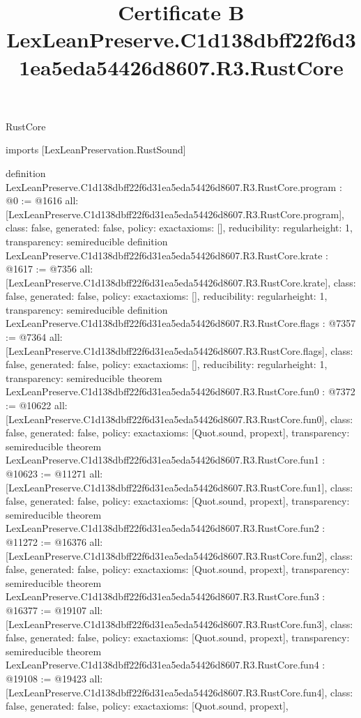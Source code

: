 \begin{lexlean}{RustCore}
\title{Certificate B LexLeanPreserve.C1d138dbff22f6d31ea5eda54426d8607.R3.RustCore}
\begin{coremodule}
imports [LexLeanPreservation.RustSound]

definition LexLeanPreserve.C1d138dbff22f6d31ea5eda54426d8607.R3.RustCore.program : @0 := @1616 {
  all: [LexLeanPreserve.C1d138dbff22f6d31ea5eda54426d8607.R3.RustCore.program],
  class: false,
  generated: false,
  policy: exact{axioms: []},
  reducibility: regular{height: 1},
  transparency: semireducible
}
definition LexLeanPreserve.C1d138dbff22f6d31ea5eda54426d8607.R3.RustCore.krate : @1617 := @7356 {
  all: [LexLeanPreserve.C1d138dbff22f6d31ea5eda54426d8607.R3.RustCore.krate],
  class: false,
  generated: false,
  policy: exact{axioms: []},
  reducibility: regular{height: 1},
  transparency: semireducible
}
definition LexLeanPreserve.C1d138dbff22f6d31ea5eda54426d8607.R3.RustCore.flags : @7357 := @7364 {
  all: [LexLeanPreserve.C1d138dbff22f6d31ea5eda54426d8607.R3.RustCore.flags],
  class: false,
  generated: false,
  policy: exact{axioms: []},
  reducibility: regular{height: 1},
  transparency: semireducible
}
theorem LexLeanPreserve.C1d138dbff22f6d31ea5eda54426d8607.R3.RustCore.fun0 : @7372 := @10622 {
  all: [LexLeanPreserve.C1d138dbff22f6d31ea5eda54426d8607.R3.RustCore.fun0],
  class: false,
  generated: false,
  policy: exact{axioms: [Quot.sound, propext]},
  transparency: semireducible
}
theorem LexLeanPreserve.C1d138dbff22f6d31ea5eda54426d8607.R3.RustCore.fun1 : @10623 := @11271 {
  all: [LexLeanPreserve.C1d138dbff22f6d31ea5eda54426d8607.R3.RustCore.fun1],
  class: false,
  generated: false,
  policy: exact{axioms: [Quot.sound, propext]},
  transparency: semireducible
}
theorem LexLeanPreserve.C1d138dbff22f6d31ea5eda54426d8607.R3.RustCore.fun2 : @11272 := @16376 {
  all: [LexLeanPreserve.C1d138dbff22f6d31ea5eda54426d8607.R3.RustCore.fun2],
  class: false,
  generated: false,
  policy: exact{axioms: [Quot.sound, propext]},
  transparency: semireducible
}
theorem LexLeanPreserve.C1d138dbff22f6d31ea5eda54426d8607.R3.RustCore.fun3 : @16377 := @19107 {
  all: [LexLeanPreserve.C1d138dbff22f6d31ea5eda54426d8607.R3.RustCore.fun3],
  class: false,
  generated: false,
  policy: exact{axioms: [Quot.sound, propext]},
  transparency: semireducible
}
theorem LexLeanPreserve.C1d138dbff22f6d31ea5eda54426d8607.R3.RustCore.fun4 : @19108 := @19423 {
  all: [LexLeanPreserve.C1d138dbff22f6d31ea5eda54426d8607.R3.RustCore.fun4],
  class: false,
  generated: false,
  policy: exact{axioms: [Quot.sound, propext]},
}
\end{coremodule}
\end{lexlean}

